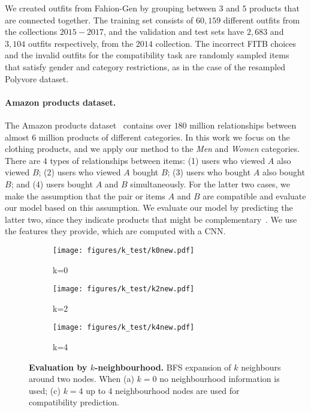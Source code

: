 \documentclass[10pt,twocolumn,letterpaper]{article}
\begin{document}
We created outfits from Fahion-Gen by grouping between $3$ and $5$ products that are connected together. The training set consists of $60{,}159$ different outfits from the collections $2015-2017$, and the validation and test sets have $2{,}683$ and $3{,}104$ outfits respectively, from the $2014$ collection. The incorrect FITB choices and the invalid outfits for the compatibility task are randomly sampled items that satisfy gender and category restrictions, as in the case of the resampled Polyvore dataset.








\paragraph{Amazon products dataset.}
\label{sssec:amazon_dataset}
The Amazon products dataset~\cite{mcauley2015image, he2016ups} contains over $180$ million relationships between almost $6$ million products of different categories. In this work we focus on the clothing products, and we apply our method to the \emph{Men} and \emph{Women} categories. There are $4$ types of relationships between items: (1) users who viewed $A$ also viewed $B$; (2) users who viewed $A$ bought $B$; (3) users who bought $A$ also bought $B$; and (4) users bought $A$ and $B$ simultaneously. For the latter two cases, we make the assumption that the pair or items $A$ and $B$ are compatible and evaluate our model based on this assumption. 
We evaluate our model by predicting the latter two, since they indicate products that might be complementary~\cite{mcauley2015image}. We use the features they provide, which are computed with a CNN.

\begin{figure}[t]
\begin{center}
\begin{subfigure}{.33\columnwidth}
  \centering
  \texttt{[image: figures/k\_test/k0new.pdf]}
  \caption{k=0}
  \label{fig:k0}
\end{subfigure}\begin{subfigure}{.33\columnwidth}
  \centering
  \texttt{[image: figures/k\_test/k2new.pdf]}
  \caption{k=2}
  \label{fig:k2}
\end{subfigure}\begin{subfigure}{.33\columnwidth}
  \centering
  \texttt{[image: figures/k\_test/k4new.pdf]}
  \caption{k=4}
  \label{fig:k4}
\end{subfigure}\end{center}
\caption{\textbf{Evaluation by $k$-neighbourhood.} BFS expansion of $k$ neighbours around two nodes. When (a) $k=0$ no neighbourhood information is used; (c) $k=4$ up to $4$ neighbourhood nodes are used for compatibility prediction.}
\end{figure}
\end{document}
